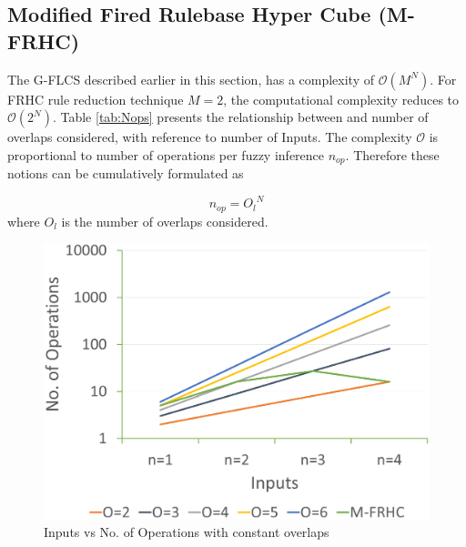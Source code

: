 \subsection{Modified Fired Rulebase Hyper Cube (M-FRHC)}
The G\hyp{}FLCS described earlier in this section, has a complexity of $ \mathcal{O}\left( {{M^N}} \right) $. For FRHC rule reduction technique $ M = 2 $, the computational complexity reduces to $ \mathcal{O}\left( {{2^N}} \right) $. Table \ref{tab:Nops} presents the relationship between and number of overlaps considered, with reference to number of Inputs. The complexity $ \mathcal{O} $ is proportional to number of operations per fuzzy inference $ n_{op}  $. Therefore these notions can be cumulatively formulated as

\begin{equation} \label{eq:overlap}
{n_{op}} = {O_l}^N
\end{equation} 
where $ O_l $ is the number of overlaps considered. 

\begin{figure}[h!]
	\centering
	\includegraphics[width=0.95\linewidth]{Chapter2/chapter2/plot_MFRHC}
	\caption{Inputs vs No. of Operations with constant overlaps}
	\label{fig:plot_MFRHC}
\end{figure}


